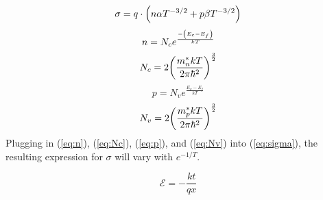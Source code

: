 \documentclass{article}
\DeclarePairedDelimiter\autobracket{(}{)}
\newcommand{\br}[1]{\autobracket*{#1}}
\begin{document}
\begin{equation} \label{eq:sigma}
\sigma = q \cdot \br{n \alpha T^{-3/2} + p \beta T^{-3/2}}
\end{equation}
\begin{equation} \label{eq:n}
n = N_c e^{\frac{-\br{E_c - E_f}}{kT}}
\end{equation}
\begin{equation} \label{eq:Nc}
N_c = 2\br{\frac{m_n^*kT}{2\pi\hbar^2}}^{\frac{3}{2}}
\end{equation}
\begin{equation} \label{eq:p}
p = N_v e^{\frac{E_v - E_f}{kT}}
\end{equation}
\begin{equation} \label{eq:Nv}
N_v = 2\br{\frac{m_p^*kT}{2\pi\hbar^2}}^{\frac{3}{2}}
\end{equation}
Plugging in (\ref{eq:n}), (\ref{eq:Nc}), (\ref{eq:p}), and (\ref{eq:Nv}) into
(\ref{eq:sigma}), the resulting expression for $\sigma$ will vary with
$e^{-1/T}$.

\[ \boxed{\mathcal{E} = -\frac{kt}{qx}} \]
\end{document}
